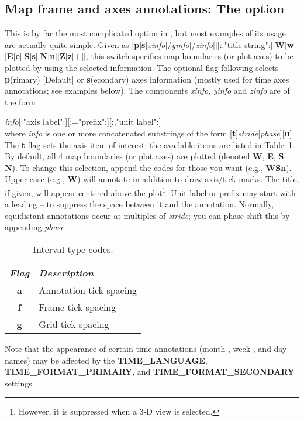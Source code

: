 \subsection{Map frame and axes annotations: The  option}
\label{sec:timeaxis}
This is by far the most complicated option in \GMT, but most examples
of its usage are actually quite simple.
Given as [\textbf{p}$|$\textbf{s}]\emph{xinfo}[/\emph{yinfo}[/\emph{zinfo}]][:."title
string":][\textbf{W}$|$\textbf{w}][\textbf{E}$|$\textbf{e}][\textbf{S}$|$\textbf{s}][\textbf{N}$|$\textbf{n}][\textbf{Z}$|$\textbf{z}[\textbf{+}]],
this switch specifies map boundaries (or plot axes) to be plotted by using the
selected information. The optional flag following  selects \textbf{p}(rimary) [Default] or \textbf{s}(econdary)
axes information (mostly used for time axes annotations; see examples below).
The components \emph{xinfo}, \emph{yinfo} and \emph{zinfo} are of the form \\

\par \emph{info}[:"axis label":][:="prefix":][:,"unit label":] \\

\noindent
where \emph{info} is one or more concatenated substrings of the form
[\textbf{t}]\emph{stride}[\PM\emph{phase}][\textbf{u}].  The \textbf{t} flag sets the axis item of interest; the
available items are listed in Table~\ref{tbl:inttype}.  By
default, all 4 map boundaries (or plot axes) are plotted (denoted \textbf{W}, \textbf{E}, \textbf{S},
\textbf{N}).  To change this selection, append the codes for those you want
(e.g., \textbf{WSn}).  Upper case (e.g., \textbf{W}) will annotate in addition to
draw axis/tick-marks.  The title, if given, will appear centered above the plot\footnote{However,
it is suppressed when a 3-D view is selected.}.  Unit label or prefix may start with a
leading -- to suppress the space between it and the annotation.  Normally, equidistant annotations
occur at multiples of \emph{stride}; you can phase-shift this by appending \PM\emph{phase}.
\begin{table}[H]
\centering
\begin{tabular}{|c|l|} \hline
\emph{Flag}	& \emph{Description} \\ \hline
\textbf{a}	&	Annotation tick spacing \\ \hline
\textbf{f}	&	Frame tick spacing \\ \hline
\textbf{g}	&	Grid tick spacing \\ \hline
\end{tabular}
\caption{Interval type codes.}
\label{tbl:inttype}
\end{table}
\noindent
Note that the appearance of certain time annotations (month-, week-, and day-names) may be affected
by the \textbf{TIME\_LANGUAGE}, \textbf{TIME\_FORMAT\_PRIMARY}, and \textbf{TIME\_FORMAT\_SECONDARY} settings.


